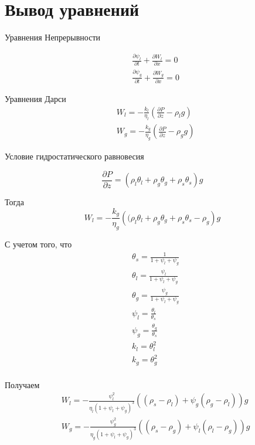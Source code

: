 \documentclass[12pt,a4paper]{article}
\newcommand{\pd}[2]{\frac{\partial #1}{\partial #2}}
\begin{document}
\section{Вывод уравнений}
Уравнения Непрерывности

\begin{equation}
\begin{aligned}
&\pd{\psi_l}{t} + \pd{W_l}{x} = 0\\
&\pd{\psi_g}{t} + \pd{W_g}{x} = 0
\end{aligned}
\end{equation}


Уравнения Дарси
\begin{equation}
\begin{aligned}
&W_l = - \frac{k_l}{\eta_l} \left(\pd{P}{z} - \rho_l g\right)\\
&W_g = - \frac{k_g}{\eta_g} \left(\pd{P}{z} - \rho_g g\right)
\label{darsi}
\end{aligned}
\end{equation}

Условие гидростатического равновесия

\begin{equation}
\pd{P}{z} = (\rho_l \theta_l + \rho_g \theta_g + \rho_s \theta_s)g
\end{equation}

Тогда
\begin{equation}
W_l =  -\frac{k_g}{\eta_g} \left((\rho_l \theta_l + \rho_g \theta_g + \rho_s \theta_s - \rho_g\right) g
\end{equation}

С учетом того, что
\begin{equation}
\begin{aligned}
&\theta_s = \frac1{1 + \psi_l + \psi_g}\\ 
&\theta_l = \frac{\psi_l}{1 + \psi_l + \psi_g}\\
&\theta_g = \frac{\psi_g}{1 + \psi_l + \psi_g}\\
&\psi_l = \frac{\theta_l}{\theta_s}\\
&\psi_g = \frac{\theta_g}{\theta_s}\\
&k_l = \theta_l^2\\
&k_g = \theta_g^2\\
\end{aligned}
\end{equation}



Получаем
\begin{equation}
\begin{aligned}
&W_l = - \frac{\psi_l^2}{\eta_l(1 + \psi_l + \psi_g)^3}((\rho_s - \rho_l) + \psi_g(\rho_g - \rho_l))g\\	
&W_g = - \frac{\psi_g^2}{\eta_g(1 + \psi_l + \psi_g)^3}((\rho_s - \rho_g) + \psi_l(\rho_l - \rho_g))g
\end{aligned}
\end{equation}
\end{document}
